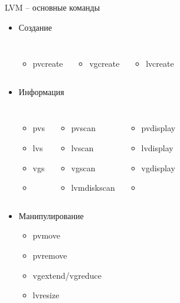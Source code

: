 \begin{frame}{LVM -- основные команды}
  \begin{itemize}
    \item Создание
      \begin{columns}
        \begin{itemize}
          \item pvcreate
        \end{itemize}
        \begin{itemize}
          \item vgcreate
        \end{itemize}
        \begin{itemize}
          \item lvcreate
        \end{itemize}
      \end{columns}
     \item Информация 
       \begin{columns}
         \begin{itemize}
           \item pvs
           \item lvs
           \item vgs
		   \item[ ]
         \end{itemize}
         \begin{itemize}
           \item pvscan
           \item lvscan
           \item vgscan
		   \item lvmdiskscan
         \end{itemize}
         \begin{itemize}
           \item pvdisplay
           \item lvdisplay
           \item vgdisplay
		   \item[ ]
         \end{itemize}
	 \end{columns}
      \item Манипулирование
        \begin{itemize}
          \item pvmove
          \item pvremove
          \item vgextend/vgreduce
          \item lvresize
         \end{itemize}
     \end{itemize}
    
\end{frame}


